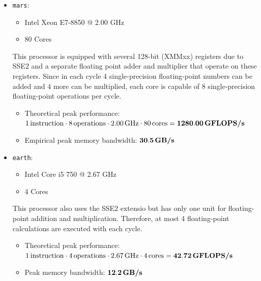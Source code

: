 \begin{itemize}
    \item \texttt{mars}:
        \begin{itemize}
            \item Intel Xeon E7-8850 @ 2.00 GHz
            \item 80 Cores
        \end{itemize}
        This processor is equipped with several 128-bit (XMMxx) registers due to SSE2 and a separate floating point adder and multiplier that operate on these registers. Since in each cycle 4 single-precision floating-point numbers can be added and 4 more can be multiplied, each core is capable of 8 single-precision floating-point operations per cycle. \cite{agnerorg}
        \begin{itemize}
            \item Theoretical peak performance: \\
            $1 \, \text{instruction} \cdot 8 \, \text{operations} \cdot 2.00 \, \text{GHz} \cdot 80 \, \text{cores} = \bold{1280.00} \, \textbf{GFLOPS/s}$
            
            \item Empirical peak memory bandwidth: $\bold{30.5} \, \textbf{GB/s}$ \\
        \end{itemize}
    \item \texttt{earth}:
        \begin{itemize}
            \item Intel Core i5 750 @ 2.67 GHz
            \item 4 Cores
        \end{itemize}
        This processor also uses the SSE2 extensio but has only one unit for floating-point addition and multiplication. Therefore, at most 4 floating-point calculations are executed with each cycle.
        \begin{itemize}
            \item Theoretical peak performance: \\
            $1 \, \text{instruction} \cdot 4 \, \text{operations} \cdot 2.67 \, \text{GHz} \cdot 4 \, \text{cores} = \bold{42.72 \, \textbf{GFLOPS/s}}$
            
            \item Peak memory bandwidth: $\bold{12.2} \, \textbf{GB/s}$ \\
        \end{itemize}
\end{itemize}


